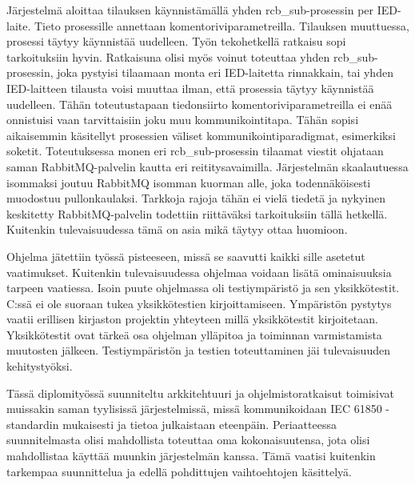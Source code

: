 Järjestelmä aloittaa tilauksen käynnistämällä yhden rcb\_sub-prosessin per IED-laite. Tieto prosessille annettaan komentoriviparametreilla. Tilauksen muuttuessa, prosessi täytyy käynnistää uudelleen. Työn tekohetkellä ratkaisu sopi tarkoituksiin hyvin. Ratkaisuna olisi myös voinut toteuttaa yhden rcb\_sub-prosessin, joka pystyisi tilaamaan monta eri IED-laitetta rinnakkain, tai yhden IED-laitteen tilausta voisi muuttaa ilman, että prosessia täytyy käynnistää uudelleen. Tähän toteutustapaan tiedonsiirto komentoriviparametreilla ei enää onnistuisi vaan tarvittaisiin joku muu kommunikointitapa. Tähän sopisi aikaisemmin käsitellyt prosessien väliset kommunikointiparadigmat, esimerkiksi soketit. Toteutuksessa monen eri rcb\_sub-prosessin tilaamat viestit ohjataan saman RabbitMQ-palvelin kautta eri reititysavaimilla. Järjestelmän skaalautuessa isommaksi joutuu RabbitMQ isomman kuorman alle, joka todennäköisesti muodostuu pullonkaulaksi. Tarkkoja rajoja tähän ei vielä tiedetä ja nykyinen keskitetty RabbitMQ-palvelin todettiin riittäväksi tarkoituksiin tällä hetkellä. Kuitenkin tulevaisuudessa tämä on asia mikä täytyy ottaa huomioon.

Ohjelma jätettiin työssä pisteeseen, missä se saavutti kaikki sille asetetut vaatimukset. Kuitenkin tulevaisuudessa ohjelmaa voidaan lisätä ominaisuuksia tarpeen vaatiessa. Isoin puute ohjelmassa oli testiympäristö ja sen yksikkötestit. C:ssä ei ole suoraan tukea yksikkötestien kirjoittamiseen. Ympäristön pystytys vaatii erillisen kirjaston projektin yhteyteen millä yksikkötestit kirjoitetaan. Yksikkötestit ovat tärkeä osa ohjelman ylläpitoa ja toiminnan varmistamista muutosten jälkeen. Testiympäristön ja testien toteuttaminen jäi tulevaisuuden kehitystyöksi.

Tässä diplomityössä suunniteltu arkkitehtuuri ja ohjelmistoratkaisut toimisivat muissakin saman tyylisissä järjestelmissä, missä kommunikoidaan IEC 61850 -standardin mukaisesti ja tietoa julkaistaan eteenpäin. Periaatteessa suunnitelmasta olisi mahdollista toteuttaa oma kokonaisuutensa, jota olisi mahdollistaa käyttää muunkin järjestelmän kanssa. Tämä vaatisi kuitenkin tarkempaa suunnittelua ja edellä pohdittujen vaihtoehtojen käsittelyä.